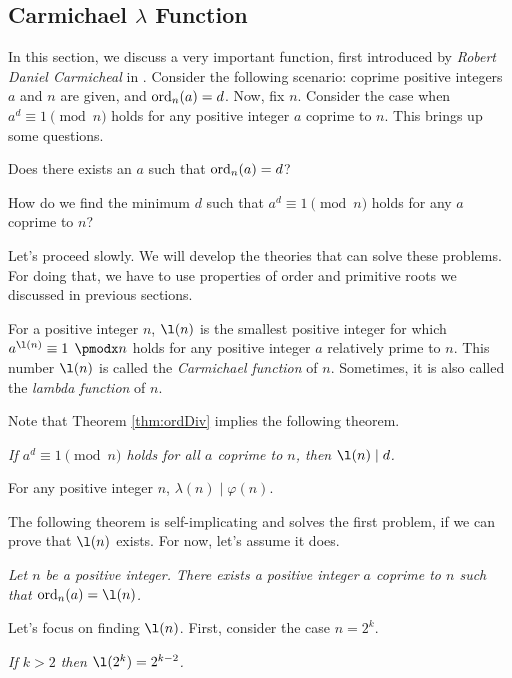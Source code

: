 \documentclass{subfile}
\begin{document}
	\subsection{Carmichael $\lambda$ Function}
	In this section, we discuss a very important function, first introduced by \textit{Robert Daniel Carmicheal} in  \cite{ch:congruence-carmichael-original}. Consider the following scenario: coprime positive integers $a$ and $n$ are given, and $\operatorname{ord}_n(a)=d$. Now, fix $n$. Consider the case when $a^d\equiv1\pmod n$ holds for any positive integer $a$ coprime to $n$. This brings up some questions.
	\begin{problem}\label{prob:CarmichaelQuestion1}
		Does there exists an $a$ such that $\operatorname{ord}_n(a)=d$?
	\end{problem}
	
	\begin{problem}\label{prob:CarmichaelQuestion2}
		How do we find the minimum $d$ such that $a^d\equiv1\pmod n$ holds for any $a$ coprime to $n$?
	\end{problem}
	Let's proceed slowly. We will develop the theories that can solve these problems. For doing that, we have to use properties of order and primitive roots we discussed in previous sections.
	\begin{definition}
		For a positive integer $n$, $\l(n)$ is the smallest positive integer for which $a^{\l(n)}\equiv1\pmod n$ holds for any positive integer $a$ relatively prime to $n$. This number $\l(n)$ is called the \textit{Carmichael function} of $n$. Sometimes, it is also called the \textit{lambda function} of $n$.
	\end{definition}
	Note that Theorem \eqref{thm:ordDiv} implies the following theorem.
	\begin{theorem}\slshape\label{thm:carDiv}
		If $a^d\equiv1\pmod n$ holds for all $a$ coprime to $n$, then $\l(n)\mid d$.
	\end{theorem}
	
	\begin{corollary}\label{cor:LambdaDividesPhi}
		For any positive integer $n$, $\lambda(n)\mid \varphi(n)$.
	\end{corollary}
	The following theorem is self-implicating and solves the first problem, if we can prove that $\l(n)$ exists. For now, let's assume it does.
	\begin{theorem}\slshape
		Let $n$ be a positive integer. There exists a positive integer $a$ coprime to $n$ such that $\ord_n(a)=\l(n)$.
	\end{theorem}
	Let's focus on finding $\l(n)$. First, consider the case $n=2^k$.
	\begin{theorem}\slshape
		If $k>2$ then $\l(2^k)=2^{k-2}$.
	\end{theorem}
	
\end{document}
